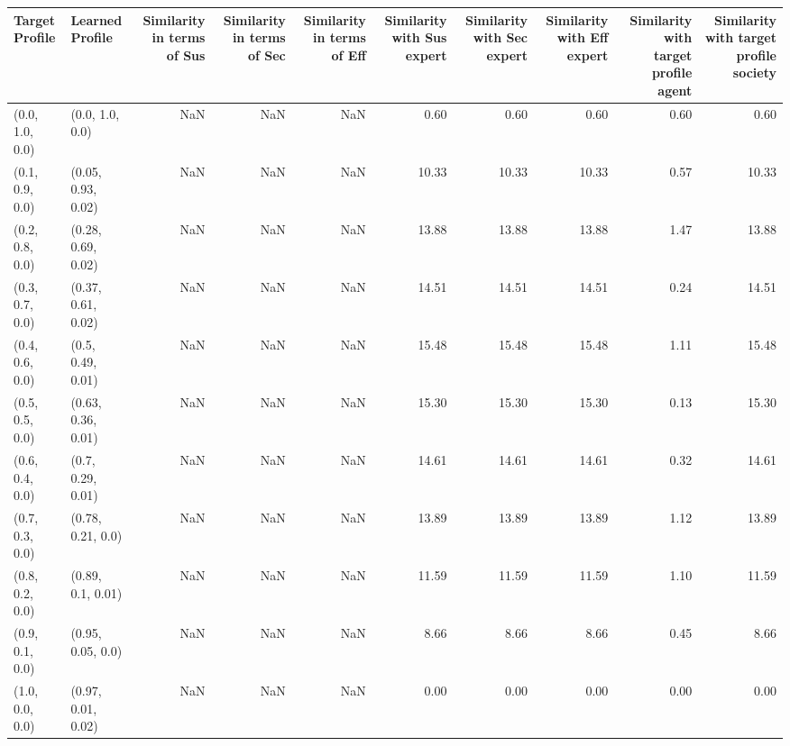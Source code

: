 \begin{tabular}{llrrrrrrrr}
\toprule
Target Profile & Learned Profile & Similarity in terms of Sus & Similarity in terms of Sec & Similarity in terms of Eff & Similarity with Sus expert & Similarity with Sec expert & Similarity with Eff expert & Similarity with target profile agent & Similarity with target profile society \\
\midrule
(0.0, 1.0, 0.0) & (0.0, 1.0, 0.0) & NaN & NaN & NaN & 0.60 & 0.60 & 0.60 & 0.60 & 0.60 \\
(0.1, 0.9, 0.0) & (0.05, 0.93, 0.02) & NaN & NaN & NaN & 10.33 & 10.33 & 10.33 & 0.57 & 10.33 \\
(0.2, 0.8, 0.0) & (0.28, 0.69, 0.02) & NaN & NaN & NaN & 13.88 & 13.88 & 13.88 & 1.47 & 13.88 \\
(0.3, 0.7, 0.0) & (0.37, 0.61, 0.02) & NaN & NaN & NaN & 14.51 & 14.51 & 14.51 & 0.24 & 14.51 \\
(0.4, 0.6, 0.0) & (0.5, 0.49, 0.01) & NaN & NaN & NaN & 15.48 & 15.48 & 15.48 & 1.11 & 15.48 \\
(0.5, 0.5, 0.0) & (0.63, 0.36, 0.01) & NaN & NaN & NaN & 15.30 & 15.30 & 15.30 & 0.13 & 15.30 \\
(0.6, 0.4, 0.0) & (0.7, 0.29, 0.01) & NaN & NaN & NaN & 14.61 & 14.61 & 14.61 & 0.32 & 14.61 \\
(0.7, 0.3, 0.0) & (0.78, 0.21, 0.0) & NaN & NaN & NaN & 13.89 & 13.89 & 13.89 & 1.12 & 13.89 \\
(0.8, 0.2, 0.0) & (0.89, 0.1, 0.01) & NaN & NaN & NaN & 11.59 & 11.59 & 11.59 & 1.10 & 11.59 \\
(0.9, 0.1, 0.0) & (0.95, 0.05, 0.0) & NaN & NaN & NaN & 8.66 & 8.66 & 8.66 & 0.45 & 8.66 \\
(1.0, 0.0, 0.0) & (0.97, 0.01, 0.02) & NaN & NaN & NaN & 0.00 & 0.00 & 0.00 & 0.00 & 0.00 \\
\bottomrule
\end{tabular}

